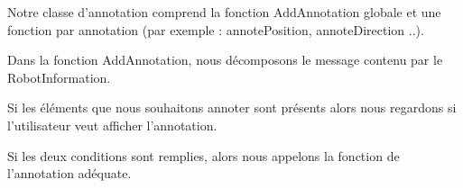 Notre classe d'annotation comprend la fonction AddAnnotation globale et une fonction par annotation (par exemple : annotePosition, annoteDirection ..).
\bigskip


Dans la fonction AddAnnotation, nous décomposons le message contenu par le RobotInformation.


Si les éléments que nous souhaitons annoter sont présents alors nous regardons si l'utilisateur veut afficher l'annotation.


Si les deux conditions sont remplies, alors nous appelons la fonction de l'annotation adéquate. 
